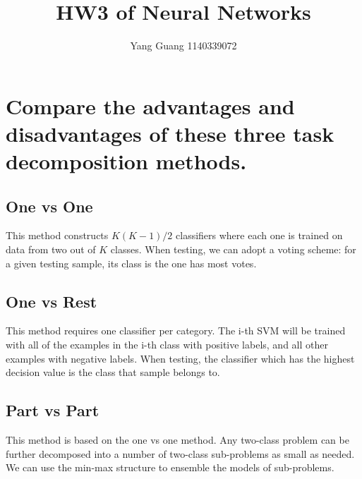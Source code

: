 \documentclass[final,authoryear,3p,times,onecolumn]{elsarticle}
\theoremstyle{definition}
\begin{document}
\begin{frontmatter}
    \title{\textbf{HW3 of Neural Networks}}
    \author{Yang Guang 1140339072}
\end{frontmatter}




\section{Compare the advantages and disadvantages of these three task decomposition methods.}

\subsection{One vs One}
This method constructs $K(K-1)/2$ classifiers where
each one is trained on data from two out of $K$
classes. When testing, we can adopt a voting scheme: for a given testing sample, its class is the one has most votes.
\subsection{One vs Rest}
This method requires one classifier per category. The i-th SVM will be trained with all of the examples in the i-th class with positive labels, and all other examples with negative labels. When testing, the classifier which has the highest decision value is the class that sample belongs to.
\subsection{Part vs Part}
This method is based on the one vs one method. Any two-class problem can be further decomposed into a number of two-class sub-problems as small as needed. We can use the min-max structure to ensemble the models of sub-problems.
\end{document}
